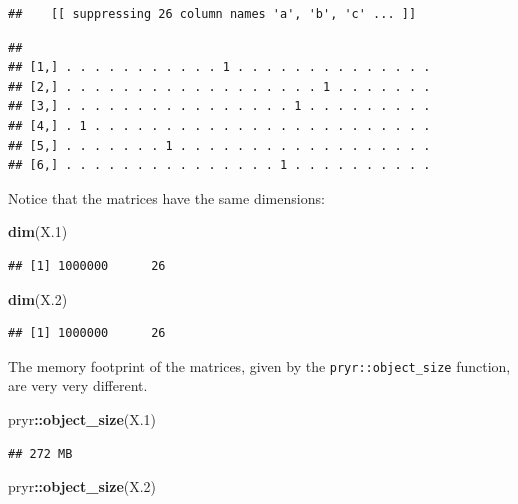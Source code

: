 \documentclass[]{book}
\newenvironment{Shaded}{\begin{snugshade}}{\end{snugshade}}
\newcommand{\KeywordTok}[1]{\textcolor[rgb]{0.13,0.29,0.53}{\textbf{#1}}}
\newcommand{\DecValTok}[1]{\textcolor[rgb]{0.00,0.00,0.81}{#1}}
\newcommand{\OperatorTok}[1]{\textcolor[rgb]{0.81,0.36,0.00}{\textbf{#1}}}
\newcommand{\NormalTok}[1]{#1}
\theoremstyle{definition}
\theoremstyle{definition}
\theoremstyle{definition}
\theoremstyle{remark}
\begin{document}
\begin{verbatim}
##    [[ suppressing 26 column names 'a', 'b', 'c' ... ]]
\end{verbatim}

\begin{verbatim}
##                                                         
## [1,] . . . . . . . . . . . 1 . . . . . . . . . . . . . .
## [2,] . . . . . . . . . . . . . . . . . . 1 . . . . . . .
## [3,] . . . . . . . . . . . . . . . . 1 . . . . . . . . .
## [4,] . 1 . . . . . . . . . . . . . . . . . . . . . . . .
## [5,] . . . . . . . 1 . . . . . . . . . . . . . . . . . .
## [6,] . . . . . . . . . . . . . . . 1 . . . . . . . . . .
\end{verbatim}

Notice that the matrices have the same dimensions:

\begin{Shaded}
\begin{Highlighting}[]
\KeywordTok{dim}\NormalTok{(X.}\DecValTok{1}\NormalTok{)}
\end{Highlighting}
\end{Shaded}

\begin{verbatim}
## [1] 1000000      26
\end{verbatim}

\begin{Shaded}
\begin{Highlighting}[]
\KeywordTok{dim}\NormalTok{(X.}\DecValTok{2}\NormalTok{)}
\end{Highlighting}
\end{Shaded}

\begin{verbatim}
## [1] 1000000      26
\end{verbatim}

The memory footprint of the matrices, given by the
\texttt{pryr::object\_size} function, are very very different.

\begin{Shaded}
\begin{Highlighting}[]
\NormalTok{pryr}\OperatorTok{::}\KeywordTok{object_size}\NormalTok{(X.}\DecValTok{1}\NormalTok{)}
\end{Highlighting}
\end{Shaded}

\begin{verbatim}
## 272 MB
\end{verbatim}

\begin{Shaded}
\begin{Highlighting}[]
\NormalTok{pryr}\OperatorTok{::}\KeywordTok{object_size}\NormalTok{(X.}\DecValTok{2}\NormalTok{)}
\end{Highlighting}
\end{Shaded}
\end{document}

